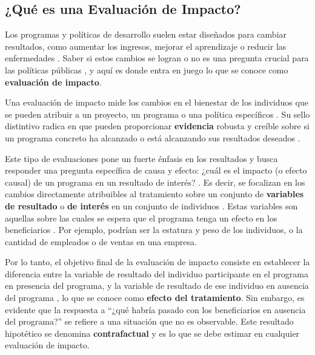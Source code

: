 \documentclass[../../main.tex]{subfiles}
\begin{document}
\subsection{¿Qué es una Evaluación de Impacto?}

Los programas y políticas de desarrollo suelen estar diseñados para cambiar resultados, como aumentar los ingresos, mejorar el aprendizaje o reducir las enfermedades \cite{gertler-2016}. Saber si estos cambios se logran o no es una pregunta crucial para las políticas públicas \cite{gertler-2016}, y aquí es donde entra en juego lo que se conoce como \textbf{evaluación de impacto}.

Una evaluación de impacto mide los cambios en el bienestar de los individuos que se pueden atribuir a un proyecto, un programa o una política específicos \cite{gertler-2016}. Su sello distintivo radica en que pueden proporcionar \textbf{evidencia} robusta y creíble sobre si un programa concreto ha alcanzado o está alcanzando sus resultados deseados \cite{gertler-2016}. 

Este tipo de evaluaciones pone un fuerte énfasis en los resultados y busca responder una pregunta específica de causa y efecto: ¿cuál es el impacto (o efecto causal) de un programa en un resultado de interés? \cite{gertler-2016}. Es decir, se focalizan en los cambios directamente atribuibles al tratamiento \cite{gertler-2016} sobre un conjunto de \textbf{variables de resultado} o \textbf{de interés} en un conjunto de individuos \cite{bernal}. Estas variables son aquellas sobre las cuales se espera que el programa tenga un efecto en los beneficiarios \cite{bernal}. Por ejemplo, podrían ser la estatura y peso de los individuos, o la cantidad de empleados o de ventas en una empresa.

Por lo tanto, el objetivo final de la evaluación de impacto consiste en establecer la diferencia entre la variable de resultado del individuo participante en el programa en presencia del programa, y la variable de resultado de ese individuo en ausencia del programa \cite{bernal}, lo que se conoce como \textbf{efecto del tratamiento}. Sin embargo, es evidente que la respuesta a ``¿qué habría pasado con los beneficiarios en ausencia del programa?'' se refiere a una situación que no es observable. Este resultado hipotético se denomina \textbf{contrafactual} y es lo que se debe estimar en cualquier evaluación de impacto.
\end{document}
